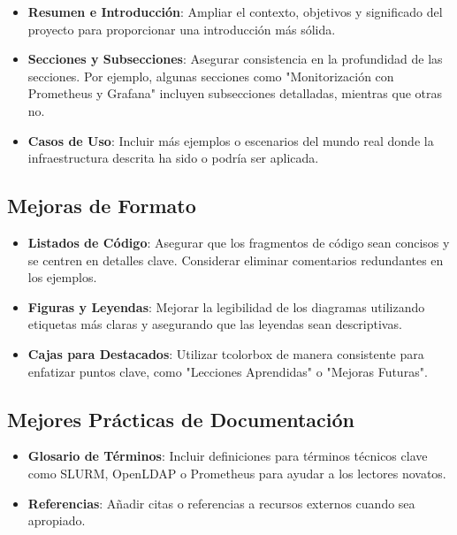 \documentclass[12pt,a4paper]{article}
\begin{document}
\begin{infobox}
\begin{itemize}
    \item \textbf{Resumen e Introducción}: Ampliar el contexto, objetivos y significado del proyecto para proporcionar una introducción más sólida.
    \item \textbf{Secciones y Subsecciones}: Asegurar consistencia en la profundidad de las secciones. Por ejemplo, algunas secciones como "Monitorización con Prometheus y Grafana" incluyen subsecciones detalladas, mientras que otras no.
    \item \textbf{Casos de Uso}: Incluir más ejemplos o escenarios del mundo real donde la infraestructura descrita ha sido o podría ser aplicada.
\end{itemize}
\end{infobox}

\subsection{Mejoras de Formato}

\begin{infobox}
\begin{itemize}
    \item \textbf{Listados de Código}: Asegurar que los fragmentos de código sean concisos y se centren en detalles clave. Considerar eliminar comentarios redundantes en los ejemplos.
    \item \textbf{Figuras y Leyendas}: Mejorar la legibilidad de los diagramas utilizando etiquetas más claras y asegurando que las leyendas sean descriptivas.
    \item \textbf{Cajas para Destacados}: Utilizar tcolorbox de manera consistente para enfatizar puntos clave, como "Lecciones Aprendidas" o "Mejoras Futuras".
\end{itemize}
\end{infobox}

\subsection{Mejores Prácticas de Documentación}

\begin{warningbox}
\begin{itemize}
    \item \textbf{Glosario de Términos}: Incluir definiciones para términos técnicos clave como SLURM, OpenLDAP o Prometheus para ayudar a los lectores novatos.
    \item \textbf{Referencias}: Añadir citas o referencias a recursos externos cuando sea apropiado.
\end{itemize}
\end{warningbox}
\end{document}
